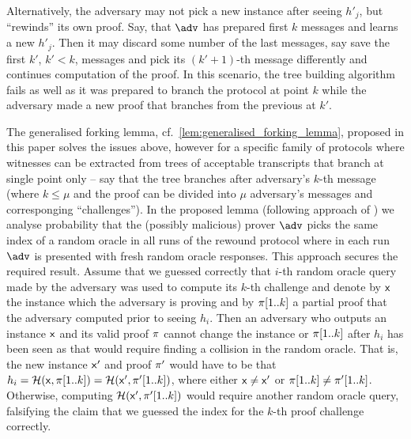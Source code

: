 \documentclass[runningheads,11pt]{llncs}
\theoremstyle{definition} \newtheorem{definition}[theorem]{Definition}
\begin{document}
Alternatively, the adversary may not pick a new instance after seeing $h'_j$,
but ``rewinds'' its own proof. Say, that $\adv$ has prepared first $k$ messages
and learns a new $h'_j$. Then it may discard some number of the last messages,
say save the first $k'$, $k' < k$, messages and pick its $(k' + 1)$-th message
differently and continues computation of the proof. In this scenario, the tree
building algorithm fails as well as it was prepared to branch the protocol at
point $k$ while the adversary made a new proof that branches from the previous
at $k'$.

The generalised forking lemma, cf.~\cref{lem:generalised_forking_lemma},
proposed in this paper solves the issues above, however for a specific family of
protocols where witnesses can be extracted from trees of acceptable transcripts
that branch at single point only -- say that the tree branches after adversary's
$k$-th message (where $k \leq \mu$ and the proof can be divided into $\mu$
adversary's messages and corresponging ``challenges''). In the proposed lemma
(following approach of \cite{CCS:BelNev06}) we analyse probability that the
(possibly malicious) prover $\adv$ picks the same index of a random oracle in
all runs of the rewound protocol where in each run $\adv$ is presented with
fresh random oracle responses. This approach secures the required result. Assume
that we guessed correctly that $i$-th random oracle query made by the adversary
was used to compute its $k$-th challenge and denote by $\mathsf{x}$ the instance which
the adversary is proving and by $\pi[1..k]$ a partial proof that the
adversary computed prior to seeing $h_i$. Then an adversary who outputs an
instance $\mathsf{x}$ and its valid proof $\pi$ cannot change the instance or
$\pi[1..k]$ after $h_i$ has been seen as that would require finding a
collision in the random oracle. That is, the new instance $\mathsf{x}'$ and proof
$\pi'$ would have to be that $h_i = \mathcal{H}(\mathsf{x}, \pi[1..k]) = \mathcal{H}(\mathsf{x}',
\pi'[1..k])$, where either $\mathsf{x} \neq \mathsf{x}'$ or $\pi[1..k] \neq
\pi'[1..k]$. Otherwise, computing $\mathcal{H}(\mathsf{x}', \pi'[1..k])$ would
require another random oracle query, falsifying the claim that we guessed the
index for the $k$-th proof challenge correctly.



\end{document}
